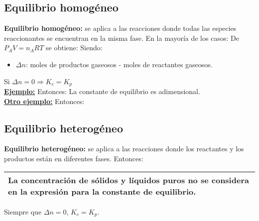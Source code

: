     \subsection{Equilibrio homogéneo}
\sangria{} \textbf{Equilibrio homogéneo:} se aplica a las reacciones donde todas las especies reaccionantes se encuentran en la misma fase.   En la mayoría de los casos:  De $P_A V = n_ART$ se obtiene:      Siendo: \begin{itemize} \item $\Delta n$: moles de productos gaseosos - moles de reactantes gaseosos.  \end{itemize} Si $\Delta n = 0 \Rightarrow K_c = K_p$ \\ \textbf{\underline{Ejemplo:}}  Entonces:   La constante de equilibrio es adimensional. \\ \textbf{\underline{Otro ejemplo:}}  Entonces: 
    \subsection{Equilibrio heterogéneo}
    \sangria{} \textbf{Equilibrio heterogéneo:} se aplica a las reacciones donde los reactantes y los productos están en diferentes fases.  Entonces:  \begin{center} \begin{tabular}{|m{8cm}|} \toprule \multicolumn{1}{|m{8cm}|}{La concentración de sólidos y líquidos puros no se considera en la expresión para la constante de equilibrio.} \\ \bottomrule \end{tabular} \end{center}   \saltoPag{} Siempre que $\Delta n = 0$, $K_c = K_p$.
